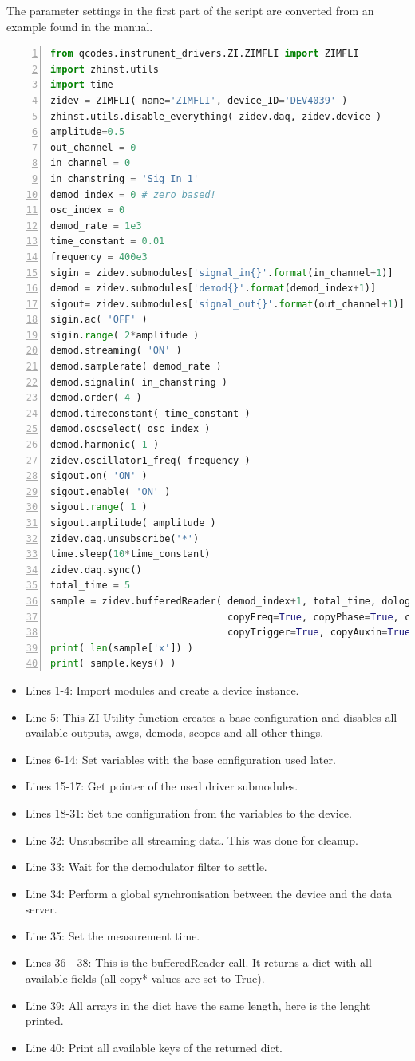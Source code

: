 \documentclass[11pt]{article} %
\begin{document}
The parameter settings in the first part of the script are converted from an example found in the manual.
\begin{lstlisting}[frame=single, language=Python, numbers=left, xleftmargin=1cm]
from qcodes.instrument_drivers.ZI.ZIMFLI import ZIMFLI
import zhinst.utils
import time
zidev = ZIMFLI( name='ZIMFLI', device_ID='DEV4039' )
zhinst.utils.disable_everything( zidev.daq, zidev.device )
amplitude=0.5
out_channel = 0
in_channel = 0
in_chanstring = 'Sig In 1'
demod_index = 0 # zero based!
osc_index = 0
demod_rate = 1e3
time_constant = 0.01
frequency = 400e3
sigin = zidev.submodules['signal_in{}'.format(in_channel+1)]
demod = zidev.submodules['demod{}'.format(demod_index+1)]
sigout= zidev.submodules['signal_out{}'.format(out_channel+1)]
sigin.ac( 'OFF' )
sigin.range( 2*amplitude )
demod.streaming( 'ON' )
demod.samplerate( demod_rate )
demod.signalin( in_chanstring )
demod.order( 4 )
demod.timeconstant( time_constant )
demod.oscselect( osc_index )
demod.harmonic( 1 )
zidev.oscillator1_freq( frequency )
sigout.on( 'ON' )
sigout.enable( 'ON' )
sigout.range( 1 )
sigout.amplitude( amplitude )
zidev.daq.unsubscribe('*')
time.sleep(10*time_constant)
zidev.daq.sync()
total_time = 5
sample = zidev.bufferedReader( demod_index+1, total_time, dolog=True,
                               copyFreq=True, copyPhase=True, copyDIO=True,
                               copyTrigger=True, copyAuxin=True )
print( len(sample['x']) )
print( sample.keys() )
\end{lstlisting}

\begin{itemize}[]
\itemsep0pt
\item Lines 1-4: Import modules and create a device instance.
\item Line 5: This ZI-Utility function creates a base configuration and disables all available outputs, awgs, demods, scopes and all other things.
\item Lines 6-14: Set variables with the base configuration used later.
\item Lines 15-17: Get pointer of the used driver submodules.
\item Lines 18-31: Set the configuration from the variables to the device.
\item Line 32: Unsubscribe all streaming data. This was done for cleanup.
\item Line 33: Wait for the demodulator filter to settle.
\item Line 34: Perform a global synchronisation between the device and the data server.
\item Line 35: Set the measurement time.
\item Lines 36 - 38: This is the bufferedReader call. It returns a dict with all available fields (all copy* values are set to True).
\item Line 39: All arrays in the dict have the same length, here is the lenght printed.
\item Line 40: Print all available keys of the returned dict.
\end{itemize}
\end{document}
